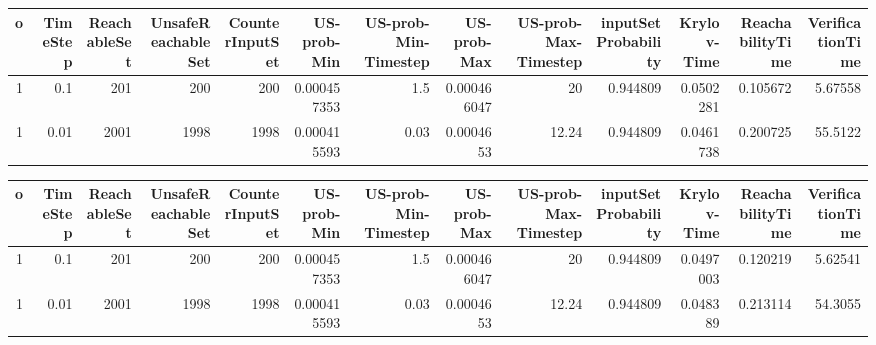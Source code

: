 \begin{tabular}{rrrrrrrrrrrrr}
\hline
   o &   TimeStep &   ReachableSet &   UnsafeReachableSet &   CounterInputSet &   US-prob-Min &   US-prob-Min-Timestep &   US-prob-Max &   US-prob-Max-Timestep &   inputSet Probability &   Krylov-Time &   ReachabilityTime &   VerificationTime \\
\hline
   1 &       0.1  &            201 &                  200 &               200 &   0.000457353 &                   1.5  &   0.000466047 &                  20    &               0.944809 &     0.0502281 &           0.105672 &            5.67558 \\
   1 &       0.01 &           2001 &                 1998 &              1998 &   0.000415593 &                   0.03 &   0.0004653   &                  12.24 &               0.944809 &     0.0461738 &           0.200725 &           55.5122  \\
\hline
\end{tabular}
\begin{tabular}{rrrrrrrrrrrrr}
\hline
   o &   TimeStep &   ReachableSet &   UnsafeReachableSet &   CounterInputSet &   US-prob-Min &   US-prob-Min-Timestep &   US-prob-Max &   US-prob-Max-Timestep &   inputSet Probability &   Krylov-Time &   ReachabilityTime &   VerificationTime \\
\hline
   1 &       0.1  &            201 &                  200 &               200 &   0.000457353 &                   1.5  &   0.000466047 &                  20    &               0.944809 &     0.0497003 &           0.120219 &            5.62541 \\
   1 &       0.01 &           2001 &                 1998 &              1998 &   0.000415593 &                   0.03 &   0.0004653   &                  12.24 &               0.944809 &     0.048389  &           0.213114 &           54.3055  \\
\hline
\end{tabular}
